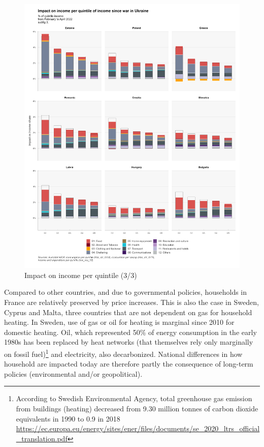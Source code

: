 \documentclass[
  9pt,
  a4paper,
  DIV=11,
  numbers=noendperiod]{scrartcl}
\begin{document}
\begin{figure}

\caption{Impact on income per quintile (3/3)}

{\centering \includegraphics[width=16cm,height=\textheight]{../svg/coicop_l1_wiu_3.png}

}

\end{figure}

Compared to other countries, and due to governmental policies,
households in France are relatively preserved by price increases. This
is also the case in Sweden, Cyprus and Malta, three countries that are
not dependent on gas for household heating. In Sweden, use of gas or oil
for heating is marginal since 2010 for domestic heating. Oil, which
represented 50\% of energy consumption in the early 1980s has been
replaced by heat networks (that themselves rely only marginally on
fossil fuel)\footnote{According to Swedish Environmental Agency, total
  greenhouse gas emission from buildings (heating) decreased from 9.30
  million tonnes of carbon dioxide equivalents in 1990 to 0.9 in 2018
  \url{https://ec.europa.eu/energy/sites/ener/files/documents/se_2020_ltrs_official_translation.pdf}}
and electricity, also decarbonized. National differences in how
household are impacted today are therefore partly the consequence of
long-term policies (environmental and/or geopolitical).
\end{document}
